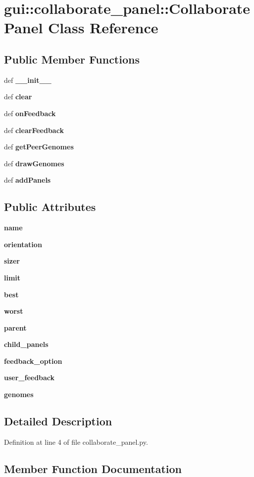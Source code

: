 \section{gui::collaborate\_\-panel::CollaboratePanel Class Reference}
\label{classgui_1_1collaborate__panel_1_1CollaboratePanel}
\subsection*{Public Member Functions}
\begin{CompactItemize}
\item 
def {\bf \_\-\_\-init\_\-\_\-}
\item 
def {\bf clear}
\item 
def {\bf onFeedback}
\item 
def {\bf clearFeedback}
\item 
def {\bf getPeerGenomes}
\item 
def {\bf drawGenomes}
\item 
def {\bf addPanels}
\end{CompactItemize}
\subsection*{Public Attributes}
\begin{CompactItemize}
\item 
{\bf name}
\item 
{\bf orientation}
\item 
{\bf sizer}
\item 
{\bf limit}
\item 
{\bf best}
\item 
{\bf worst}
\item 
{\bf parent}
\item 
{\bf child\_\-panels}
\item 
{\bf feedback\_\-option}
\item 
{\bf user\_\-feedback}
\item 
{\bf genomes}
\end{CompactItemize}


\subsection{Detailed Description}


Definition at line 4 of file collaborate\_\-panel.py.

\subsection{Member Function Documentation}
